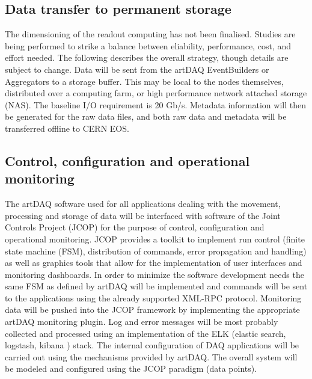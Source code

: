 \subsection{Data transfer to permanent storage}


The dimensioning of the readout computing has not been finalised.  Studies 
are being performed to strike a balance between eliability, performance, cost, and 
effort needed.  The following describes the overall strategy, though
details are subject to change.
Data will be sent from the artDAQ EventBuilders or Aggregators to 
a storage buffer.  This may be local to the nodes themselves, distributed
over a computing farm, or high performance network attached storage (NAS).
The baseline I/O requirement is 20 Gb/s.  Metadata information will then
be generated for the raw data files, and both raw data and metadata will
be transferred offline to CERN EOS.


\subsection{Control, configuration and operational monitoring}

The artDAQ software used for all applications dealing with the movement,
processing and storage of data will be interfaced with software of the
Joint Controls Project (JCOP) for the purpose of control, configuration
and operational monitoring.  JCOP provides a toolkit to implement run
control (finite state machine (FSM), distribution of commands, error
propagation and handling) as well as graphics tools that allow for the
implementation of user interfaces and monitoring dashboards.  In order to
minimize the software development needs the same FSM as defined by artDAQ
will be implemented and commands will be sent to the applications using
the already supported XML-RPC protocol.  Monitoring data will be pushed
into the JCOP framework by implementing the appropriate artDAQ monitoring
plugin.  Log and error messages will be most probably collected and
processed using an implementation of the ELK (elastic search, logstash,
kibana \cite{elastic:kibana}) stack. 
 The internal configuration of DAQ applications will be
carried out using the mechanisms provided by artDAQ. The overall system
will be modeled and configured using the JCOP paradigm (data points).


